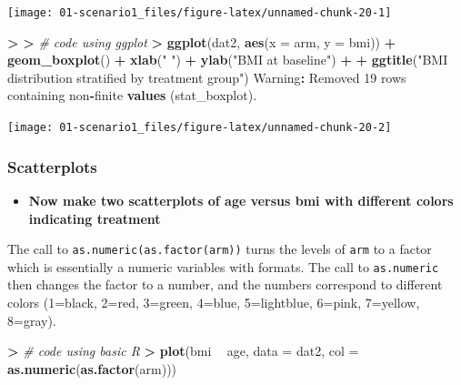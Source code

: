 \documentclass[
]{book}
\newenvironment{Shaded}{\begin{snugshade}}{\end{snugshade}}
\newcommand{\CommentTok}[1]{\textcolor[rgb]{0.56,0.35,0.01}{\textit{#1}}}
\newcommand{\DataTypeTok}[1]{\textcolor[rgb]{0.13,0.29,0.53}{#1}}
\newcommand{\DecValTok}[1]{\textcolor[rgb]{0.00,0.00,0.81}{#1}}
\newcommand{\ErrorTok}[1]{\textcolor[rgb]{0.64,0.00,0.00}{\textbf{#1}}}
\newcommand{\KeywordTok}[1]{\textcolor[rgb]{0.13,0.29,0.53}{\textbf{#1}}}
\newcommand{\NormalTok}[1]{#1}
\newcommand{\OperatorTok}[1]{\textcolor[rgb]{0.81,0.36,0.00}{\textbf{#1}}}
\newcommand{\StringTok}[1]{\textcolor[rgb]{0.31,0.60,0.02}{#1}}
\providecommand{\tightlist}{%
  \setlength{\itemsep}{0pt}\setlength{\parskip}{0pt}}
\begin{document}
\begin{center}\texttt{[image: 01-scenario1\_files/figure-latex/unnamed-chunk-20-1]} \end{center}

\begin{Shaded}
\begin{Highlighting}[]
\OperatorTok{>}\StringTok{ }
\ErrorTok{>}\StringTok{ }\CommentTok{# code using ggplot}
\ErrorTok{>}\StringTok{ }\KeywordTok{ggplot}\NormalTok{(dat2, }\KeywordTok{aes}\NormalTok{(}\DataTypeTok{x =}\NormalTok{ arm, }\DataTypeTok{y =}\NormalTok{ bmi)) }\OperatorTok{+}\StringTok{ }\KeywordTok{geom_boxplot}\NormalTok{() }\OperatorTok{+}\StringTok{ }\KeywordTok{xlab}\NormalTok{(}\StringTok{" "}\NormalTok{) }\OperatorTok{+}\StringTok{ }\KeywordTok{ylab}\NormalTok{(}\StringTok{"BMI at baseline"}\NormalTok{) }\OperatorTok{+}\StringTok{ }
\OperatorTok{+}\StringTok{     }\KeywordTok{ggtitle}\NormalTok{(}\StringTok{"BMI distribution stratified by treatment group"}\NormalTok{)}
\NormalTok{Warning}\OperatorTok{:}\StringTok{ }\NormalTok{Removed }\DecValTok{19}\NormalTok{ rows containing non}\OperatorTok{-}\NormalTok{finite }\KeywordTok{values}\NormalTok{ (stat_boxplot).}
\end{Highlighting}
\end{Shaded}

\begin{center}\texttt{[image: 01-scenario1\_files/figure-latex/unnamed-chunk-20-2]} \end{center}

\hypertarget{scatterplots}{%
\subsubsection{Scatterplots}\label{scatterplots}}

\begin{itemize}
\tightlist
\item
  \textbf{Now make two scatterplots of age versus bmi with different colors indicating treatment}
\end{itemize}

The call to \texttt{as.numeric(as.factor(arm))} turns the levels of \texttt{arm} to a factor which is essentially a numeric variables with formats. The call to \texttt{as.numeric} then changes the factor to a number, and the numbers correspond to different colors (1=black, 2=red, 3=green, 4=blue, 5=lightblue, 6=pink, 7=yellow, 8=gray).

\begin{Shaded}
\begin{Highlighting}[]
\OperatorTok{>}\StringTok{ }\CommentTok{# code using basic R}
\ErrorTok{>}\StringTok{ }\KeywordTok{plot}\NormalTok{(bmi }\OperatorTok{~}\StringTok{ }\NormalTok{age, }\DataTypeTok{data =}\NormalTok{ dat2, }\DataTypeTok{col =} \KeywordTok{as.numeric}\NormalTok{(}\KeywordTok{as.factor}\NormalTok{(arm)))}
\end{Highlighting}
\end{Shaded}
\end{document}
